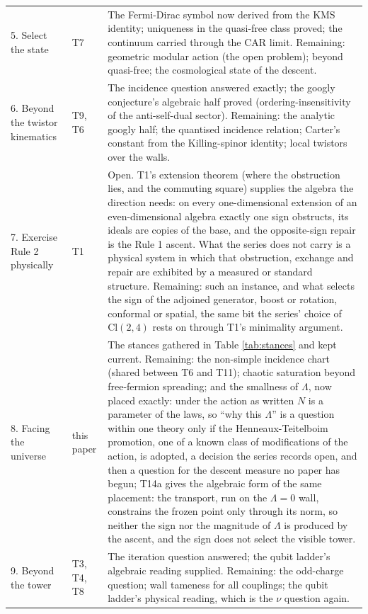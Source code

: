 \documentclass[11pt]{article}
\theoremstyle{definition}
\newcommand{\Cl}{\mathrm{Cl}}
\begin{document}
\begin{longtable}{p{} p{} p{}}
5. Select the state & T7 & The Fermi-Dirac symbol now derived from the KMS identity; uniqueness in the quasi-free class proved; the continuum carried through the CAR limit. Remaining: geometric modular action (the open problem); beyond quasi-free; the cosmological state of the descent. \\
6. Beyond the twistor kinematics & T9, T6 & The incidence question answered exactly; the googly conjecture's algebraic half proved (ordering-insensitivity of the anti-self-dual sector). Remaining: the analytic googly half; the quantised incidence relation; Carter's constant from the Killing-spinor identity; local twistors over the walls. \\
7. Exercise Rule 2 physically & T1 & Open. T1's extension theorem (where the obstruction lies, and the commuting square) supplies the algebra the direction needs: on every one-dimensional extension of an even-dimensional algebra exactly one sign obstructs, its ideals are copies of the base, and the opposite-sign repair is the Rule 1 ascent. What the series does not carry is a physical system in which that obstruction, exchange and repair are exhibited by a measured or standard structure. Remaining: such an instance, and what selects the sign of the adjoined generator, boost or rotation, conformal or spatial, the same bit the series' choice of $\Cl(2,4)$ rests on through T1's minimality argument. \\
8. Facing the universe & this paper & The stances gathered in Table \ref{tab:stances} and kept current. Remaining: the non-simple incidence chart (shared between T6 and T11); chaotic saturation beyond free-fermion spreading; and the smallness of $\Lambda$, now placed exactly: under the action as written $N$ is a parameter of the laws, so ``why this $\Lambda$'' is a question within one theory only if the Henneaux-Teitelboim promotion, one of a known class of modifications of the action, is adopted, a decision the series records open, and then a question for the descent measure no paper has begun; T14a \cite{ButlerT14a} gives the algebraic form of the same placement: the transport, run on the $\Lambda = 0$ wall, constrains the frozen point only through its norm, so neither the sign nor the magnitude of $\Lambda$ is produced by the ascent, and the sign does not select the visible tower. \\
9. Beyond the tower & T3, T4, T8 & The iteration question answered; the qubit ladder's algebraic reading supplied. Remaining: the odd-charge question; wall tameness for all couplings; the qubit ladder's physical reading, which is the $\nu$ question again. \\

\end{longtable}
\end{document}
